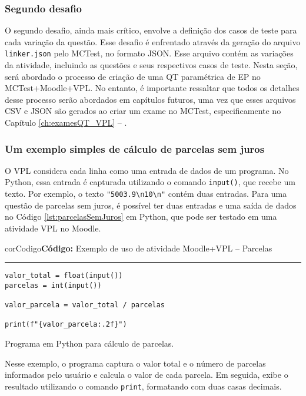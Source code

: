 \subsubsection{Segundo desafio}

O segundo desafio, ainda mais crítico, envolve a definição dos casos de teste para cada variação da questão. Esse desafio é enfrentado através da geração do arquivo \verb|linker.json| pelo MCTest, no formato JSON. Esse arquivo contém as variações da atividade, incluindo as questões e seus respectivos casos de teste. Nesta seção, será abordado o processo de criação de uma QT paramétrica de EP no MCTest+Moodle+VPL. No entanto, é importante ressaltar que todos os detalhes desse processo serão abordados em capítulos futuros, uma vez que esses arquivos CSV e JSON são gerados ao criar um exame no MCTest, especificamente no Capítulo \ref{ch:examesQT_VPL} -- .

\subsubsection{Um exemplo simples de cálculo de parcelas sem juros}

O VPL considera cada linha como uma entrada de dados de um programa. No Python, essa entrada é capturada utilizando o comando \verb|input()|, que recebe um texto. Por exemplo, o texto \verb|"5003.9\n10\n"| contém duas entradas. Para uma questão de parcelas sem juros, é possível ter duas entradas e uma saída de dados no Código \ref{lst:parcelasSemJuros} em Python, que pode ser testado em uma atividade VPL no Moodle.
%
\begin{listing}[!ht]
\begin{myboxCode}{corCodigo}{\textbf{Código: } Exemplo de uso de atividade Moodle+VPL -- Parcelas}\vspace{3mm}
\hrule
\begin{verbatim}
valor_total = float(input())
parcelas = int(input())

valor_parcela = valor_total / parcelas

print(f"{valor_parcela:.2f}")
\end{verbatim}
\end{myboxCode}
\caption{Programa em Python para cálculo de parcelas.}
\label{lst:parcelasSemJuros}
\end{listing}
%
Nesse exemplo, o programa captura o valor total e o número de parcelas informados pelo usuário e calcula o valor de cada parcela. Em seguida, exibe o resultado utilizando o comando \verb|print|, formatando com duas casas decimais.

